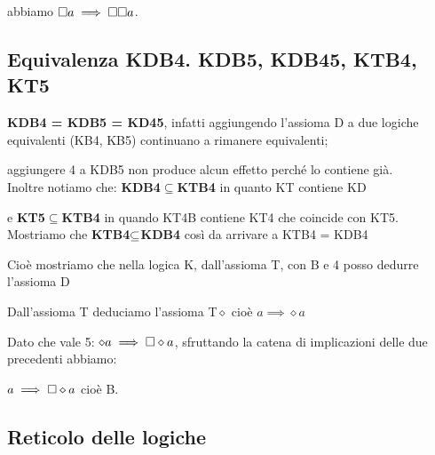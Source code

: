 abbiamo $\square a\implies\square\square a$.\\



\subsection{Equivalenza KDB4. KDB5, KDB45, KTB4, KT5}

\textbf{KDB4 = KDB5 = KD45}, infatti aggiungendo l'assioma D a due
logiche equivalenti (KB4, KB5) continuano a rimanere equivalenti;

aggiungere 4 a KDB5 non produce alcun effetto perché lo contiene già.\\


Inoltre notiamo che: \textbf{KDB4$\subseteq$KTB4} in quanto KT contiene
KD

e \textbf{KT5$\subseteq$KTB4} in quando KT4B contiene KT4 che coincide
con KT5.\\


Mostriamo che \textbf{KTB4$\mbox{\ensuremath{\subseteq}}$KDB4 }così
da arrivare a KTB4 = KDB4

Cioè mostriamo che nella logica K, dall'assioma T, con B e 4 posso
dedurre l'assioma D

Dall'assioma T deduciamo l'assioma T$\diamond$ cioè $a\implies\diamond a$

Dato che vale 5: $\diamond a\implies\square\diamond a$, sfruttando la catena
di implicazioni delle due precedenti abbiamo:

$a\implies\square\diamond a$ cioè B.\\



\subsection{Reticolo delle logiche}

